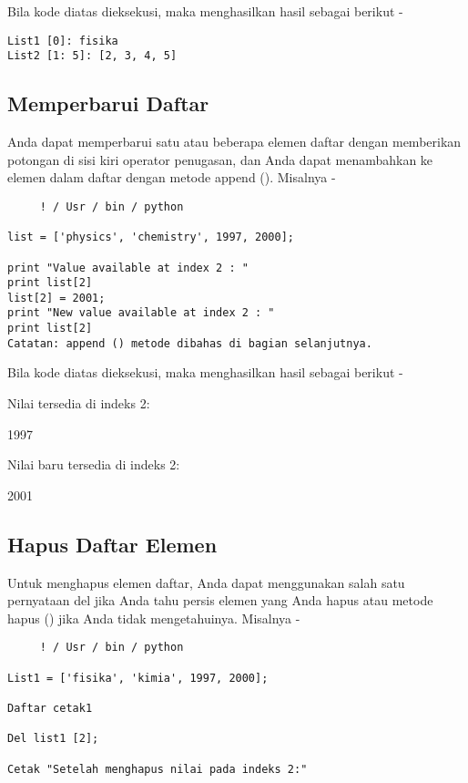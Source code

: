 Bila kode diatas dieksekusi, maka menghasilkan hasil sebagai berikut - 

\begin{verbatim}
List1 [0]: fisika 
List2 [1: 5]: [2, 3, 4, 5] 
\end{verbatim}
\subsection{Memperbarui Daftar}

Anda dapat memperbarui satu atau beberapa elemen daftar dengan memberikan potongan di sisi kiri operator penugasan, dan Anda dapat menambahkan ke elemen dalam daftar dengan metode append (). Misalnya - 

\begin{verbatim}
     ! / Usr / bin / python 

list = ['physics', 'chemistry', 1997, 2000]; 

print "Value available at index 2 : " 
print list[2] 
list[2] = 2001; 
print "New value available at index 2 : " 
print list[2] 
Catatan: append () metode dibahas di bagian selanjutnya. 
\end{verbatim}

Bila kode diatas dieksekusi, maka menghasilkan hasil sebagai berikut - 

Nilai tersedia di indeks 2: 

1997 

Nilai baru tersedia di indeks 2: 

2001 

\subsection{Hapus Daftar Elemen} 

Untuk menghapus elemen daftar, Anda dapat menggunakan salah satu pernyataan del jika Anda tahu persis elemen yang Anda hapus atau metode hapus () jika Anda tidak mengetahuinya. Misalnya - 

\begin{verbatim}
     ! / Usr / bin / python 

List1 = ['fisika', 'kimia', 1997, 2000]; 

Daftar cetak1 

Del list1 [2]; 

Cetak "Setelah menghapus nilai pada indeks 2:" 
\end{verbatim}

